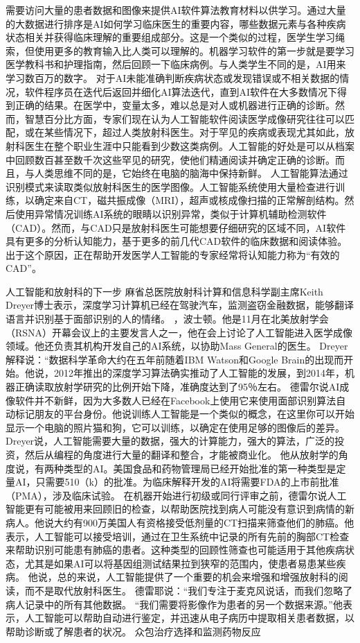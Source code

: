 需要访问大量的患者数据和图像来提供AI软件算法教育材料以供学习。通过大量的大数据进行排序是AI如何学习临床医生的重要内容，哪些数据元素与各种疾病状态相关并获得临床理解的重要组成部分。这是一个类似的过程，医学生学习绳索，但使用更多的教育输入比人类可以理解的。机器学习软件的第一步就是要学习医学教科书和护理指南，然后回顾一下临床病例。与人类学生不同的是，AI用来学习数百万的数字。
对于AI未能准确判断疾病状态或发现错误或不相关数据的情况，软件程序员在迭代后返回并细化AI算法迭代，直到AI软件在大多数情况下得到正确的结果。在医学中，变量太多，难以总是对人或机器进行正确的诊断。然而，智慧百分比方面，专家们现在认为人工智能软件阅读医学成像研究往往可以匹配，或在某些情况下，超过人类放射科医生。对于罕见的疾病或表现尤其如此，放射科医生在整个职业生涯中只能看到少数这类病例。人工智能的好处是可以从档案中回顾数百甚至数千次这些罕见的研究，使他们精通阅读并确定正确的诊断。而且，与人类思维不同的是，它始终在电脑的脑海中保持新鲜。
人工智能算法通过识别模式来读取类似放射科医生的医学图像。人工智能系统使用大量检查进行训练，以确定来自CT，磁共振成像（MRI），超声或核成像扫描的正常解剖结构。然后使用异常情况训练AI系统的眼睛以识别异常，类似于计算机辅助检测软件（CAD）。然而，与CAD只是放射科医生可能想要仔细研究的区域不同，AI软件具有更多的分析认知能力，基于更多的前几代CAD软件的临床数据和阅读体验。出于这个原因，正在帮助开发医学人工智能的专家经常将认知能力称为“有效的CAD”。
   
人工智能和放射科的下一步
麻省总医院放射科计算和信息科学副主席Keith Dreyer博士表示，深度学习计算机已经在驾驶汽车，监测盗窃金融数据，能够翻译语言并识别基于面部识别的人的情绪。 ，波士顿。他是11月在北美放射学会（RSNA）开幕会议上的主要发言人之一，他在会上讨论了人工智能进入医学成像领域。他还负责其机构开发自己的AI系统，以协助Mass General的医生。
Dreyer解释说：“数据科学革命大约在五年前随着IBM Watson和Google Brain的出现而开始。他说，2012年推出的深度学习算法确实推动了人工智能的发展，到2014年，机器正确读取放射学研究的比例开始下降，准确度达到了95％左右。
德雷尔说AI成像软件并不新鲜，因为大多数人已经在Facebook上使用它来使用面部识别算法自动标记朋友的平台身份。他说训练人工智能是一个类似的概念，在这里你可以开始显示一个电脑的照片猫和狗，它可以训练，以确定在使用足够的图像后的差异。
Dreyer说，人工智能需要大量的数据，强大的计算能力，强大的算法，广泛的投资，然后从编程的角度进行大量的翻译和整合，才能被商业化。
他从放射学的角度说，有两种类型的AI。美国食品和药物管理局已经开始批准的第一种类型是定量AI，只需要510（k）的批准。为临床解释开发的AI将需要FDA的上市前批准（PMA），涉及临床试验。
在机器开始进行初级或同行评审之前，德雷尔说人工智能更有可能被用来回顾旧的检查，以帮助医院找到病人可能没有意识到病情的新病人。他说大约有900万美国人有资格接受低剂量的CT扫描来筛查他们的肺癌。他表示，人工智能可以接受培训，通过在卫生系统中记录的所有先前的胸部CT检查来帮助识别可能患有肺癌的患者。这种类型的回顾性筛查也可能适用于其他疾病状态，尤其是如果AI可以将基因组测试结果拉到狭窄的范围内，使患者易患某些疾病。
他说，总的来说，人工智能提供了一个重要的机会来增强和增强放射科的阅读，而不是取代放射科医生。
德雷耶说：“我们专注于麦克风说话，而我们忽略了病人记录中的所有其他数据。 “我们需要将影像作为患者的另一个数据来源。”他表示，人工智能可以帮助自动进行鉴定，并迅速从电子病历中提取相关患者数据，以帮助诊断或了解患者的状况。
众包治疗选择和监测药物反应


